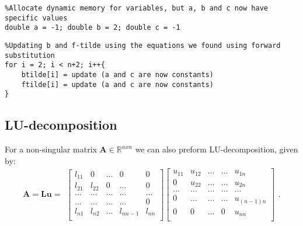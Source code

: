 \documentclass{emulateapj}
\newcommand{\R}{\mathbb{R}}
\begin{document}
%
\begin{lstlisting}
%Allocate dynamic memory for variables, but a, b and c now have specific values
double a = -1; double b = 2; double c = -1
\end{lstlisting}

\begin{lstlisting}
%Updating b and f-tilde using the equations we found using forward substitution
for i = 2; i < n+2; i++{
    btilde[i] = update (a and c are now constants)
    ftilde[i] = update (a and c are now constants)
}

\end{lstlisting}
%

\subsection{LU-decomposition}

For a non-singular matrix $\boldsymbol{A} \in \R ^{nxn}$ we can also preform LU-decomposition, given by:
%
\[ \boldsymbol{A} = \boldsymbol{Lu} =
\begin{array}{c}
\begin{bmatrix}\label{eq:A = Lu}
l_{11}     & 0           & \dots         & 0       & 0 \\
l_{21}     & l_{22}           & 0       & \dots      & 0       \\
\dots       & \dots           & \dots       & \dots      & \dots    \\
\dots       & \dots           & \dots       & \dots      & 0    \\
 l_{n1} &  l_{n2}            & \dots        & l_{nn-1}      & l_{nn}     \\
\end{bmatrix}
\begin{bmatrix}
u_{11}     & u_{12}            & \dots         & \dots       & u_{1n} \\
0     & u_{22}           & \dots       & \dots      & u_{2n}       \\
\dots       & \dots           & \dots       & \dots      & \dots    \\
0       & \dots           & \dots       & \dots      & u_{(n-1)n}    \\
 0 &  0            & \dots        & 0      & u_{nn}     \\
\end{bmatrix}

\end{array}.
\]
%

\end{document}
